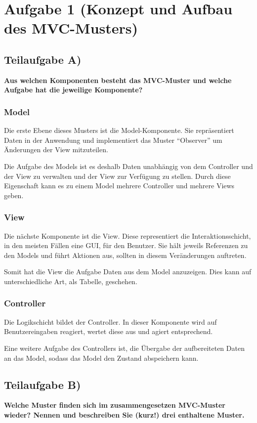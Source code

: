 \section{Aufgabe 1 (Konzept und Aufbau des MVC-Musters)}

\subsection{Teilaufgabe A)}
\textbf{Aus welchen Komponenten besteht das MVC-Muster und welche Aufgabe hat die
jeweilige Komponente?}

\subsubsection{Model}
Die erste Ebene dieses Musters ist die Model-Komponente. Sie repräsentiert
Daten in der Anwendung und implementiert das Muster "`Observer"' um Änderungen
der View mitzuteilen.

Die Aufgabe des Models ist es deshalb Daten unabhängig von dem Controller und
der View zu verwalten und der View zur Verfügung zu stellen. Durch diese
Eigenschaft kann es zu einem Model mehrere Controller und mehrere Views
geben.

\subsubsection{View}
Die nächste Komponente ist die View. Diese representiert die
Interaktionsschicht, in den meisten Fällen eine GUI, für den Benutzer. Sie hält
jeweils Referenzen zu den Models und führt Aktionen aus, sollten in diesem
Veränderungen auftreten.

Somit hat die View die Aufgabe Daten aus dem Model anzuzeigen. Dies kann auf
unterschiedliche Art, \zB als Tabelle, geschehen.

\subsubsection{Controller}

Die Logikschicht bildet der Controller. In dieser Komponente wird auf
Benutzereingaben reagiert, wertet diese aus und agiert entsprechend.

Eine weitere Aufgabe des Controllers ist, die Übergabe der aufbereiteten Daten
an das Model, sodass das Model den Zustand abspeichern kann.

\clearpage
\subsection{Teilaufgabe B)}
\textbf{Welche Muster finden sich im zusammengesetzen MVC-Muster wieder? Nennen und
beschreiben Sie (kurz!) drei enthaltene Muster.}

